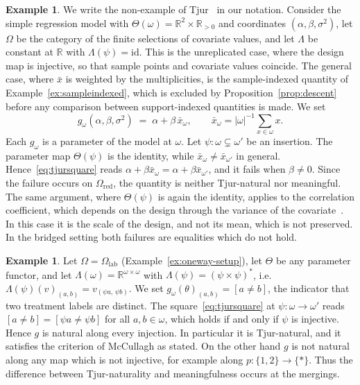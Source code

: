 \documentclass[11pt,a4paper]{article}
\theoremstyle{plain}
\theoremstyle{definition}
\newtheorem{example}[theorem]{Example}
\theoremstyle{remark}
\newcommand{\cat}[1]{\mathsf{#1}}
\newcommand{\catO}{\cat{\Omega}}
\newcommand{\id}{\mathrm{id}}
\newcommand{\R}{\mathbb{R}}
\begin{document}
\begin{example}\label{ex:alphabetaxbar}
We write the non-example of
Tjur~\cite[pp.~1299--1300]{tjur_discussion_2002} in our notation. Consider the
simple regression model with $\Theta(\omega) = \R^2 \times \R_{>0}$ and
coordinates $(\alpha,\beta,\sigma^2)$, let $\catO$ be the category of the
finite selections of covariate values, and let $\Lambda$ be constant at $\R$
with $\Lambda(\psi) = \id$. This is the unreplicated case, where the design
map is injective, so that sample points and covariate values coincide. The
general case, where $\bar x$ is weighted by the multiplicities, is the
sample-indexed quantity of Example~\ref{ex:sampleindexed}, which is excluded by
Proposition~\ref{prop:descent} before any comparison between support-indexed
quantities is made. We set
\[
g_{\omega}(\alpha,\beta,\sigma^2) \;=\; \alpha + \beta\,\bar x_{\omega},
\qquad
\bar x_{\omega} = |\omega|^{-1}\textstyle\sum_{x \in \omega} x .
\]
Each $g_\omega$ is a parameter of the model at $\omega$. Let
$\psi \colon \omega \subsetneq \omega'$ be an insertion. The parameter map
$\Theta(\psi)$ is the identity, while $\bar x_\omega \neq \bar x_{\omega'}$ in
general. Hence~\eqref{eq:tjursquare} reads
$\alpha + \beta\bar x_{\omega} = \alpha + \beta\bar x_{\omega'}$, and it fails
when $\beta \neq 0$. Since the failure occurs on $\catO_{\mathrm{red}}$, the
quantity is neither Tjur-natural nor meaningful. The same argument, where
$\Theta(\psi)$ is again the identity, applies to the correlation coefficient,
which depends on the design through the variance of the
covariate~\cite[\S6.2]{mccullagh_what_2002}. In this case it is the scale of
the design, and not its mean, which is not preserved. In the bridged setting
both failures are equalities which do not hold.
\end{example}

\begin{example}\label{ex:tjurgap}
Let $\catO = \catO_{\mathrm{lab}}$ (Example~\ref{ex:oneway-setup}), let
$\Theta$ be any parameter functor, and let
$\Lambda(\omega) = \R^{\omega \times \omega}$ with
$\Lambda(\psi) = (\psi\times\psi)^{*}$, i.e.\
$\Lambda(\psi)(v)_{(a,b)} = v_{(\psi a,\,\psi b)}$. We set
$g_\omega(\theta)_{(a,b)} = [a \neq b]$, the indicator that two treatment
labels are distinct. The square~\eqref{eq:tjursquare} at
$\psi \colon \omega \to \omega'$ reads $[a \neq b] = [\psi a \neq \psi b]$ for
all $a,b \in \omega$, which holds if and only if $\psi$ is injective. Hence
$g$ is natural along every injection. In particular it is Tjur-natural, and it
satisfies the criterion of McCullagh as stated. On the other hand $g$ is not
natural along any map which is not injective, for example along
$p \colon \{1,2\} \to \{*\}$. Thus the difference between Tjur-naturality and
meaningfulness occurs at the mergings.
\end{example}
\end{document}

